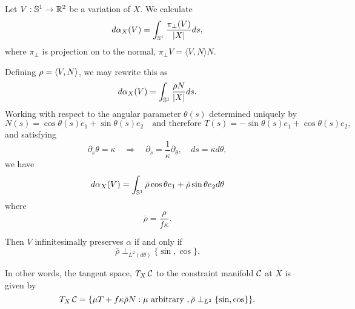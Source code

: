 Let $V:\operatorname{\mathbb{S}^1}\to{\mathbb R}^2$ be a variation of $X$.  We calculate
\[
d\alpha_X (V) = \int_{\operatorname{\mathbb{S}^1}} \frac{\pi_{\perp} (V)}{|X|} ds,
\]
where $\pi_\perp$ is projection on to the normal, $\pi_\perp{V}= \langle V,N\rangle N$.  

Defining \(\rho = \left\langle{V},{N}\right\rangle\), we may rewrite this as
\[
d\alpha_X (V) = \int_{\operatorname{\mathbb{S}^1}} \frac{\rho N}{|X|} ds.
\]
Working with respect to the angular parameter \(\theta(s)\) determined uniquely by
\[
N(s) = \cos \theta(s) e_1 + \sin \theta(s) e_2 \quad %
\text{and therefore }
T(s) = -\sin \theta(s) e_1 + \cos \theta(s) e_2,
\]
and satisfying
\[
\partial_s \theta = \kappa \quad \Rightarrow \quad \partial_s = \frac{1}{\kappa} \partial_{\theta}, \quad ds = \kappa d\theta,
\]
we have
\[
d\alpha_X (V) = \int_{\operatorname{\mathbb{S}^1}} \bar{\rho} \cos\theta e_1 + \bar{\rho} \sin\theta e_2 d\theta
\]
where
\[
\bar{\rho} = \frac{\rho}{f \kappa}.
\]

Then \(V\) infinitesimally preserves \(\alpha\) if and only if
\[
\bar{\rho} \perp_{L^2(d\theta)} \{\sin, \cos\}.
\]

In other words, the tangent space, \(T_X \operatorname{\mathcal{C}}\) to the constraint manifold \(\operatorname{\mathcal{C}}\) at \(X\) is given by
\[
T_X \operatorname{\mathcal{C}} = \{\mu T + f\kappa\bar{\rho} N : \mu \text{ arbitrary }, \bar{\rho} \perp_{L^2} \{\sin, \cos\}\}.
\]



